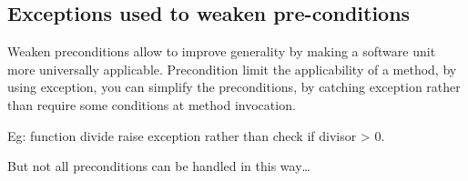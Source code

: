 \subsection{Exceptions used to weaken pre-conditions}
Weaken preconditions allow to improve generality by making a software unit more
universally applicable. Precondition limit the applicability of a method, by using exception,
you can simplify the preconditions, by catching exception rather than require some
conditions at method invocation. \newline

Eg: function divide raise exception rather than check if divisor > 0. \newline

But not all preconditions can be handled in this way\ldots
